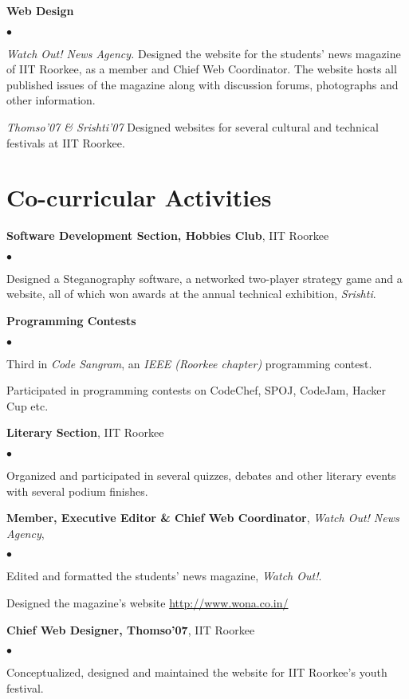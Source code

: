 \documentclass[margin,line]{res}
\newenvironment{list2}{
  \begin{list}{$\bullet$}{%
      \setlength{\itemsep}{0in}
      \setlength{\parsep}{0in} \setlength{\parskip}{0in}
      \setlength{\topsep}{0in} \setlength{\partopsep}{0in} 
      \setlength{\leftmargin}{0.2in}}}{\end{list}}
\begin{document}
\begin{resume}
{\bf Web Design}
\begin{list2}
\item {\em Watch Out! News Agency.} Designed the website for the students' news magazine of IIT Roorkee, as a member and Chief Web Coordinator. The website hosts all published issues of the magazine along with discussion forums, photographs and other information.
\item {\em Thomso'07 \& Srishti'07} Designed websites for several cultural and technical festivals at IIT Roorkee.
\end{list2}

\section{\sc Co-curricular Activities} 
{\bf Software Development Section, Hobbies Club}, IIT Roorkee
\begin{list2}
\item Designed a Steganography software, a networked two-player strategy game and a website, all of which won awards at the annual technical exhibition, {\em Srishti}.
\end{list2}
{\bf Programming Contests}
\begin{list2}
\item Third in {\em Code Sangram}, an {\em IEEE (Roorkee chapter)} programming contest.
\item Participated in programming contests on CodeChef, SPOJ, CodeJam, Hacker Cup etc.
\end{list2}
{\bf Literary Section}, IIT Roorkee
\begin{list2}
\item Organized and participated in several quizzes, debates and other literary events with several podium finishes.
\end{list2}
{\bf Member, Executive Editor \& Chief Web Coordinator}, {\em Watch Out! News Agency},
\begin{list2}
\item Edited and formatted the students' news magazine, {\em Watch Out!}.
\item Designed the magazine's website \url{http://www.wona.co.in/}
\end{list2}
{\bf Chief Web Designer, Thomso'07}, IIT Roorkee
\begin{list2}
\item Conceptualized, designed and maintained the website for IIT Roorkee's youth festival.
\end{list2}


\end{resume}
\end{document}
